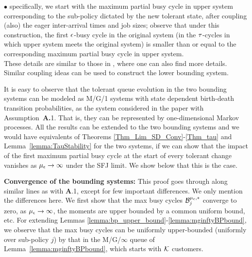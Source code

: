 {\noindent $\bullet$ specifically, we start with the maximum partial
busy cycle in upper system corresponding to the sub-policy dictated by
the new tolerant state, after coupling (also) the eager inter-arrival
times and job sizes; observe that under this construction, the first
${ \epsilon }$-busy cycle in the original system (in the ${\tau}$-cycles in which
upper system meets the original system) is smaller than or equal to
the corresponding maximum partial busy cycle in upper system.\\

These details are similar to those in \cite{ANOR}, where one can also
find more details. Similar coupling ideas can be used to construct the
lower bounding system.

It is easy to observe that the tolerant queue evolution in the two
bounding systems can be modeled as M/G/1 systems with state dependent
birth-death transition probabilities, as the system considered in the
paper with Assumption~{\bf A.}1.  That is, they can be represented by
one-dimensional Markov processes.  All the results can be extended to
the two bounding systems and we would have equivalents of Theorems
\ref{Thm_Lim_SD_Conv}-\ref{Thm_tau} and Lemma~\ref{lemma:TauStability}
for the two systems, if we can show that the impact of the first
maximum partial busy cycle at the start of every tolerant change
vanishes as ${\mu_\epsilon} \rightarrow \infty$ under the SFJ limit. We show below that
this is the case.

{\bf Convergence of the bounding systems:} This proof goes through
along similar lines as with {\bf A}.1, except for few important
differences. We only mention the differences here.  We first show that
the max busy cycles $\mathcal{B}_{j}^{{\mu_\epsilon}, *}$ converge to zero, as
$\mu_{ \epsilon } \to \infty$, the moments are upper bounded by a common uniform
bound, etc. For extending Lemmas
\ref{lemma:bp_upper_bound}-\ref{lemma:mginftyBPbound}, we observe that
the max busy cycles can be uniformly upper-bounded (uniformly over
sub-policy $j$) by that in the M/G/$\infty$ queue of
Lemma~\ref{lemma:mginftyBPbound}, which starts with ${\cal K}$
customers.
  
}
